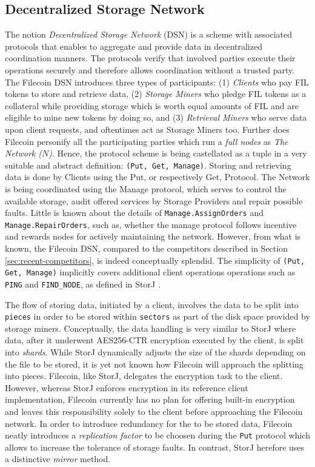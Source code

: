 \documentclass[journal]{IEEEtran}
\begin{document}
\subsection{Decentralized Storage Network}
\label{subsec:dsn}
The notion \textit{Decentralized Storage Network} (DSN) is a scheme with associated protocols that enables to aggregate and provide data in decentralized coordination manners.
The protocols verify that involved parties execute their operations securely and therefore allows coordination without a trusted party.
The Filecoin DSN introduces three types of participants: (1) \textit{Clients} who pay FIL tokens to store and retrieve data, (2) \textit{Storage Miners} who pledge FIL tokens as a collateral while providing storage which is worth equal amounts of FIL and are eligible to mine new tokens by doing so, and (3) \textit{Retrieval Miners} who serve data upon client requests, and oftentimes act as Storage Miners too.
Further does Filecoin personify all the participating parties which run a \textit{full nodes} as \textit{The Network ($N$)}.
Hence, the protocol scheme is being castellated as a tuple in a very suitable and abstract definition: \texttt{(Put, Get, Manage)}.
Storing and retrieving data is done by Clients using the Put, or respectively Get, Protocol.
The Network is being coordinated using the Manage protocol, which serves to control the available storage, audit offered services by Storage Providers and repair possible faults.
Little is known about the details of \texttt{Manage.AssignOrders} and \texttt{Manage.RepairOrders}, such as, whether the manage protocol follows incentive and rewards nodes for actively maintaining the network.
However, from what is known, the Filecoin DSN, compared to the competitors described in Section \ref{sec:recent-competitors}, is indeed conceptually splendid.
The simplicity of \texttt{(Put, Get, Manage)} implicitly covers additional client operations operations such as \texttt{PING} and \texttt{FIND\_NODE}, as defined in StorJ \cite{storj}.

The flow of storing data, initiated by a client, involves the data to be split into \texttt{pieces} in order to be stored within \texttt{sectors} as part of the disk space provided by storage miners.
Conceptually, the data handling is very similar to StorJ\cite{storj} where data, after it underwent AES256-CTR encryption executed by the client, is split into \textit{shards}.
While StorJ dynamically adjusts the size of the shards depending on the file to be stored, it is yet not known how Filecoin will approach the splitting into pieces.
Filecoin, like StorJ, delegates the encryption task to the client.
However, whereas StorJ enforces encryption in its reference client implementation, Filecoin currently has no plan for offering built-in encryption and leaves this responsibility solely to the client before approaching the Filecoin network.
In order to introduce redundancy for the to be stored data, Filecoin neatly introduces a \textit{replication factor} to be choosen during the \texttt{Put} protocol which allows to increase the tolerance of storage faults.
In contrast, StorJ herefore uses a distinctive \textit{mirror} method.
\end{document}
